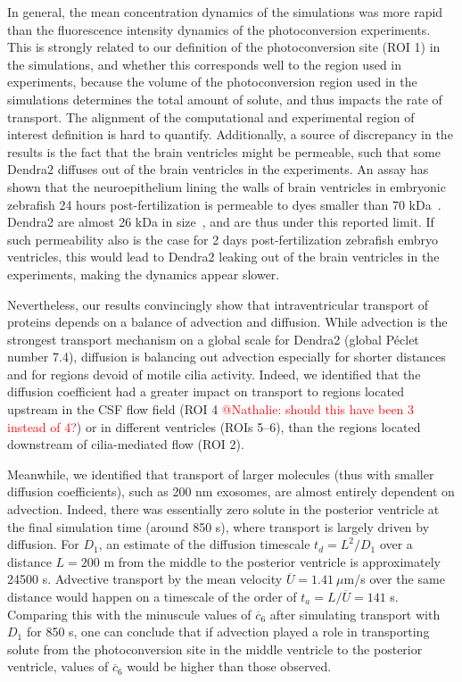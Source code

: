 \documentclass[fleqn]{wlscirep}
\newcommand{\cbar}{\overline{c}}
\newcommand{\fixme}[1]{\textcolor{red}{#1}}
\begin{document}
In general, the mean concentration dynamics of the simulations was 
more rapid than the fluorescence intensity dynamics of the photoconversion experiments.
This is strongly related to our definition of the photoconversion site
(ROI 1) in the simulations, and whether this corresponds well to the
region used in experiments, because the volume of the photoconversion
region used in the simulations determines the total amount of solute,
and thus impacts the rate of transport. The alignment of the computational
and experimental region of interest definition is hard to quantify.
Additionally, a source of discrepancy in the results is the fact that the
brain ventricles might be permeable, such that some Dendra2 diffuses out
of the brain ventricles in the experiments. An assay has shown that the neuroepithelium
lining the walls of brain ventricles in embryonic zebrafish 24 hours post-fertilization
is permeable to dyes smaller than 70 kDa~\cite{Chang2012AnNeuroepithelium}.
Dendra2 are almost 26 kDa in size~\cite{Gurskaya2006EngineeringLight},
and are thus under this reported limit. If such permeability also is the case for 2 days
post-fertilization zebrafish embryo ventricles, this would lead to Dendra2 leaking
out of the brain ventricles in the experiments, making the dynamics appear slower. 

Nevertheless, our results convincingly show that intraventricular transport of proteins
depends on a balance of advection and diffusion. While advection is the strongest transport
mechanism on a global scale for Dendra2 (global Péclet number 7.4), diffusion is balancing out
advection especially for shorter distances and for regions devoid of motile cilia activity.
Indeed, we identified that the diffusion coefficient had a greater impact on transport to
regions located upstream in the CSF flow field (ROI 4 \fixme{@Nathalie: should this have been 3 instead of 4?}) or in different ventricles (ROIs 5--6),
than the regions located downstream of cilia-mediated flow (ROI 2).

Meanwhile, we identified that transport of larger molecules
(thus with smaller diffusion coefficients),
such as 200 nm exosomes, are almost entirely dependent on advection.
Indeed, there was essentially zero solute in the posterior ventricle at the
final simulation time (around 850 s), where transport is largely driven by diffusion.
For $D_1$, an estimate of the diffusion timescale $t_d=L^2/D_1$ over a distance
$L=200$ \textmu m from the middle to the posterior ventricle is approximately 24500 s.
Advective transport by the mean velocity $\overline{U}=1.41 \ \mu$m/s over the same distance would happen
on a timescale of the order of $t_a=L/\overline{U}=141$ s. Comparing this with the minuscule values of
$\cbar_6$ after simulating transport with $D_1$ for 850 s, one can conclude that if advection
played a role in transporting solute from the photoconversion site in the middle ventricle
to the posterior ventricle, values of $\cbar_6$ would be higher than those observed.
\end{document}
